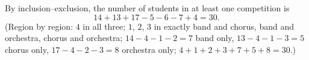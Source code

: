 By inclusion--exclusion, the number of students in at least one competition is
\[
14+13+17-5-6-7+4=\boxed{30}.
\]
(Region by region: $4$ in all three; $1$, $2$, $3$ in exactly band and chorus, band and orchestra, chorus and orchestra; $14-4-1-2=7$ band only, $13-4-1-3=5$ chorus only, $17-4-2-3=8$ orchestra only; $4+1+2+3+7+5+8=30$.)
